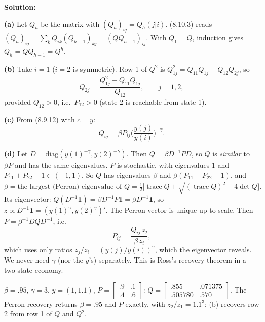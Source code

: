 \documentclass[12pt, letterpaper]{article}
\newcommand{\tr}{\operatorname{trace}}
\begin{document}
\begin{tcolorbox}[evenbox,title={Exercise 8.24 \quad Recovering probabilities from prices}]
\textbf{Solution:}

\textbf{(a)} Let $Q_h$ be the matrix with $(Q_h)_{ij}=Q_h(j|i)$. (8.10.3) reads
$(Q_h)_{ij}=\sum_kQ_{ik}(Q_{h-1})_{kj}=(QQ_{h-1})_{ij}$. With $Q_1=Q$, induction gives $Q_h=QQ_{h-1}=Q^h$.

\textbf{(b)} Take $i=1$ ($i=2$ is symmetric). Row 1 of $Q^2$ is $Q^2_{1j}=Q_{11}Q_{1j}+Q_{12}Q_{2j}$, so
\[
Q_{2j}=\frac{Q^2_{1j}-Q_{11}Q_{1j}}{Q_{12}},\qquad j=1,2,
\]
provided $Q_{12}>0$, i.e.\ $P_{12}>0$ (state 2 is reachable from state 1).

\textbf{(c)} From (8.9.12) with $c=y$:
\[
Q_{ij}=\beta P_{ij}\Big(\frac{y(j)}{y(i)}\Big)^{-\gamma}.
\]

\textbf{(d)} Let $D=\mathrm{diag}(y(1)^{-\gamma},y(2)^{-\gamma})$. Then $Q=\beta D^{-1}PD$, so $Q$ is \emph{similar} to $\beta P$
and has the same eigenvalues. $P$ is stochastic, with eigenvalues $1$ and $P_{11}+P_{22}-1\in(-1,1)$. So $Q$ has
eigenvalues $\beta$ and $\beta(P_{11}+P_{22}-1)$, and
\[
\beta=\text{the largest (Perron) eigenvalue of }Q=\tfrac12\Big[\tr Q+\sqrt{(\tr Q)^2-4\det Q}\Big].
\]
Its eigenvector: $Q(D^{-1}\mathbf 1)=\beta D^{-1}P\mathbf 1=\beta D^{-1}\mathbf 1$, so $z\propto D^{-1}\mathbf 1=(y(1)^\gamma,y(2)^\gamma)'$.
The Perron vector is unique up to scale. Then $P=\beta^{-1}DQD^{-1}$, i.e.
\[
P_{ij}=\frac{Q_{ij}\,z_j}{\beta\,z_i},
\]
which uses only ratios $z_j/z_i=(y(j)/y(i))^\gamma$, which the eigenvector reveals. We never need $\gamma$ (nor the
$y$'s) separately. This is Ross's recovery theorem in a two-state economy.

\begin{tcolorbox}[databox]
$\beta=.95$, $\gamma=3$, $y=(1,1.1)$, $P=\begin{bmatrix}.9&.1\\.4&.6\end{bmatrix}$:
$Q=\begin{bmatrix}.855&.071375\\.505780&.570\end{bmatrix}$. The Perron recovery returns $\beta=.95$ and $P$ exactly,
with $z_2/z_1=1.1^3$; (b) recovers row 2 from row 1 of $Q$ and $Q^2$.
\end{tcolorbox}
\end{tcolorbox}
\end{document}
